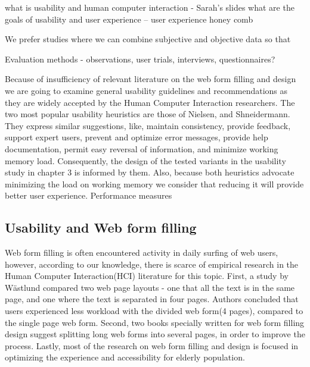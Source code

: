 \documentclass[a4paper]{report}
\begin{document}
	what is usability and human computer interaction - Sarah's slides
	what are the goals of usability and user experience -- user experience honey comb
	
	We prefer studies where we can combine subjective and objective data so that
		
	Evaluation methods - observations, user trials, interviews, questionnaires?
			
	Because of insufficiency of relevant literature on the web form filling and design we are going to examine general usability guidelines and recommendations as they are widely accepted by the Human Computer Interaction researchers. The two most popular usability heuristics are those of Nielsen\cite{nielsen1990heuristic}, and Shneidermann\cite{shneiderman1992designing}. They express similar suggestions, like, maintain consistency, provide feedback, support expert users, prevent and optimize error messages, provide help documentation, permit easy reversal of information, and minimize working memory load. Consequently, the design of the tested variants in the usability study in chapter 3 is informed by them. Also, because both heuristics advocate minimizing the load on working memory we consider that reducing it will provide better user experience.
	Performance measures
			\subsection{Usability and Web form filling}	
			Web form filling is often encountered activity in daily surfing of web users, however, according to our knowledge, there is scarce of empirical research in the Human Computer Interaction(HCI) literature for this topic. First, a study by Wästlund\cite{Wastlund20081229} compared two web page layouts - one that all the text is in the same page, and one where the text is separated in four pages. Authors concluded that users experienced less workload with the divided web form(4 pages), compared to the single page web form. Second, two books specially written for web form filling design\cite{jarrett2009forms,wroblewski2008web} suggest splitting long web forms into several pages, in order to improve the process. Lastly, most of the research on web form filling and design is focused in optimizing the experience and accessibility for elderly population\cite{sayago2012selective,chadwick2003web,lines2006online,sayago2007some}.\\
			
\end{document}
